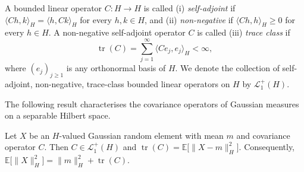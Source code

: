\begin{definition}
A bounded linear operator \(C:H\to H\) is called (i) \emph{self-adjoint} if \(\langle Ch,k\rangle_H=\langle h,Ck\rangle_H\) for every \(h,k\in H\), and (ii) \emph{non-negative} if \(\langle Ch,h\rangle_H\geqslant0\) for every \(h\in H\). A non-negative self-adjoint operator \(C\) is called (iii) \emph{trace class} if
\[
\operatorname{tr}(C)=\sum_{j=1}^{\infty}\langle Ce_j,e_j\rangle_H<\infty,
\]
where \((e_j)_{j\geqslant1}\) is any orthonormal basis of \(H\). We denote the collection of self-adjoint, non-negative, trace-class bounded linear operators on \(H\) by \(\mathcal L_1^+(H)\).
\end{definition}

The following result characterises the covariance operators of Gaussian measures on a separable Hilbert space.

\begin{theorem}\label{thm:Covariance operator of a Gaussian random element}
Let \(X\) be an \(H\)-valued Gaussian random element with mean \(m\) and covariance operator \(C\). Then \(C\in\mathcal L_1^+(H)\) and \(\operatorname{tr}(C)=\mathbb E\bigl[\|X-m\|_H^2\bigr]\). Consequently, \(\mathbb E\bigl[\|X\|_H^2\bigr]=\|m\|_H^2+\operatorname{tr}(C)
\).
\end{theorem}

